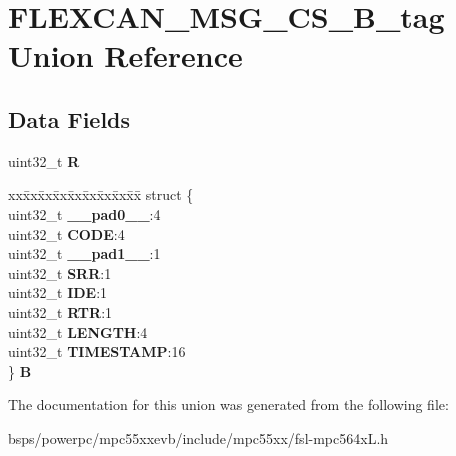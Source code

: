 \hypertarget{unionFLEXCAN__MSG__CS__32B__tag}{}\section{F\+L\+E\+X\+C\+A\+N\+\_\+\+M\+S\+G\+\_\+\+C\+S\+\_\+B\+\_\+tag Union Reference}
\label{unionFLEXCAN__MSG__CS__32B__tag}
\subsection*{Data Fields}
\begin{DoxyCompactItemize}
\item 
\mbox{\label{unionFLEXCAN__MSG__CS__32B__tag_a85b9e3de502d97141af4ec7d252d9348}} 
uint32\+\_\+t {\bfseries R}
\item 
\mbox{\label{unionFLEXCAN__MSG__CS__32B__tag_a93cce905f0c24026df3a7cfa1b59f1ae}} 
\begin{tabbing}
xx\=xx\=xx\=xx\=xx\=xx\=xx\=xx\=xx\=\kill
struct \{\\
\>uint32\_t {\bfseries \_\_pad0\_\_}:4\\
\>uint32\_t {\bfseries CODE}:4\\
\>uint32\_t {\bfseries \_\_pad1\_\_}:1\\
\>uint32\_t {\bfseries SRR}:1\\
\>uint32\_t {\bfseries IDE}:1\\
\>uint32\_t {\bfseries RTR}:1\\
\>uint32\_t {\bfseries LENGTH}:4\\
\>uint32\_t {\bfseries TIMESTAMP}:16\\
\} {\bfseries B}\\

\end{tabbing}\end{DoxyCompactItemize}


The documentation for this union was generated from the following file\+:\begin{DoxyCompactItemize}
\item 
bsps/powerpc/mpc55xxevb/include/mpc55xx/fsl-\/mpc564x\+L.\+h\end{DoxyCompactItemize}
